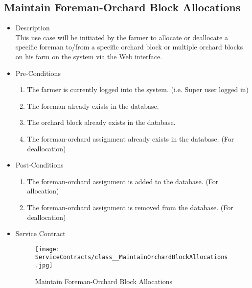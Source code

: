 \documentclass[11pt,fleqn]{book} %
\begin{document}
\subsection{Maintain Foreman-Orchard Block Allocations}
\begin{itemize}
	\item Description\\
	This use case will be initiated by the farmer to allocate or deallocate a specific foreman to/from a specific orchard block or multiple orchard blocks on his farm on the system via the Web interface.
	\item Pre-Conditions
	\begin{enumerate}
		\item The farmer is currently logged into the system. (i.e. Super user logged in)
		\item The foreman already exists in the database. 
		\item The orchard block already exists in the database.
		\item The foreman-orchard assignment already exists in the database. (For deallocation)					
	\end{enumerate}
	\item Post-Conditions
	\begin{enumerate}
		\item The foreman-orchard assignment is added to the database. (For allocation)
		\item The foreman-orchard assignment is removed from the database. (For deallocation)
	\end{enumerate}
	\item Service Contract
	\begin{figure}
		\texttt{[image: ServiceContracts/class\_\_MaintainOrchardBlockAllocations.jpg]}
		\caption{Maintain Foreman-Orchard Block Allocations}
	\end{figure}
\end{itemize}
\end{document}

